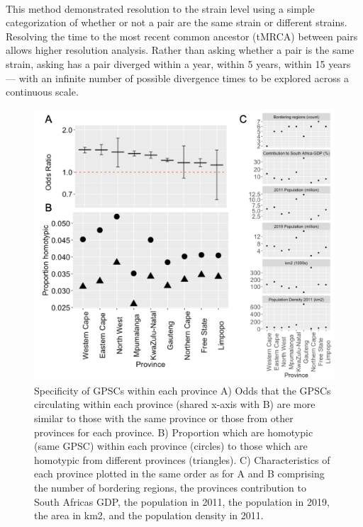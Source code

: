 \documentclass{article}
\begin{document}
\\This method demonstrated resolution to the strain level using a simple categorization of whether or not a pair are the same strain or different strains. Resolving the time to the most recent common ancestor (tMRCA) between pairs allows higher resolution analysis. Rather than asking whether a pair is the same strain, asking has a pair diverged within a year, within 5 years, within 15 years --- with an infinite number of possible divergence times to be explored across a continuous scale. 
\begin{figure}[H]
\centering
    \includegraphics[width=\textwidth]{withinvsbetween.png}
    \caption{Specificity of GPSCs within each province A) Odds that the GPSCs circulating within each province (shared x-axis with B) are more similar to those with the same province or those from other provinces for each province. B) Proportion which are homotypic (same GPSC) within each province (circles) to those which are homotypic from different provinces (triangles). C) Characteristics of each province plotted in the same order as for A and B comprising the number of bordering regions, the provinces contribution to South Africas GDP, the population in 2011, the population in 2019, the area in km2, and the population density in 2011.}
      \label{fig:withinbetween}
\end{figure}
\end{document}
